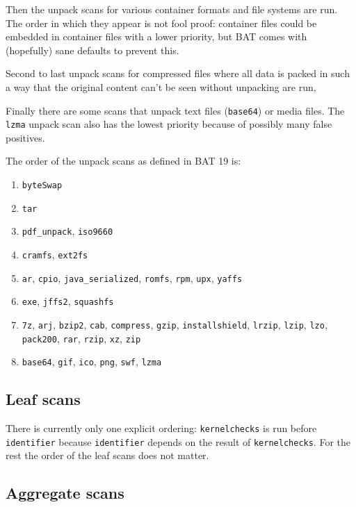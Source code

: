 \documentclass[10pt]{article}
\begin{document}
Then the unpack scans for various container formats and file systems are run.
The order in which they appear is not fool proof: container files could be
embedded in container files with a lower priority, but BAT comes with
(hopefully) sane defaults to prevent this.

Second to last unpack scans for compressed files where all data is packed in
such a way that the original content can't be seen without unpacking are run,

Finally there are some scans that unpack text files (\texttt{base64}) or media
files. The \texttt{lzma} unpack scan also has the lowest priority because of
possibly many false positives.

The order of the unpack scans as defined in BAT 19 is:

\begin{enumerate}
\item \texttt{byteSwap}
\item \texttt{tar}
\item \texttt{pdf\_unpack}, \texttt{iso9660}
\item \texttt{cramfs}, \texttt{ext2fs}
\item \texttt{ar}, \texttt{cpio}, \texttt{java\_serialized}, \texttt{romfs},
\texttt{rpm}, \texttt{upx}, \texttt{yaffs}
\item \texttt{exe}, \texttt{jffs2}, \texttt{squashfs}
\item \texttt{7z}, \texttt{arj}, \texttt{bzip2}, \texttt{cab},
\texttt{compress}, \texttt{gzip}, \texttt{installshield}, \texttt{lrzip},
\texttt{lzip}, \texttt{lzo}, \texttt{pack200}, \texttt{rar}, \texttt{rzip},
\texttt{xz}, \texttt{zip}
\item \texttt{base64}, \texttt{gif}, \texttt{ico}, \texttt{png}, \texttt{swf},
\texttt{lzma}
\end{enumerate}

\subsection{Leaf scans}

There is currently only one explicit ordering: \texttt{kernelchecks} is run
before \texttt{identifier} because \texttt{identifier} depends on the result
of \texttt{kernelchecks}. For the rest the order of the leaf scans does not
matter.

\subsection{Aggregate scans}
\end{document}
